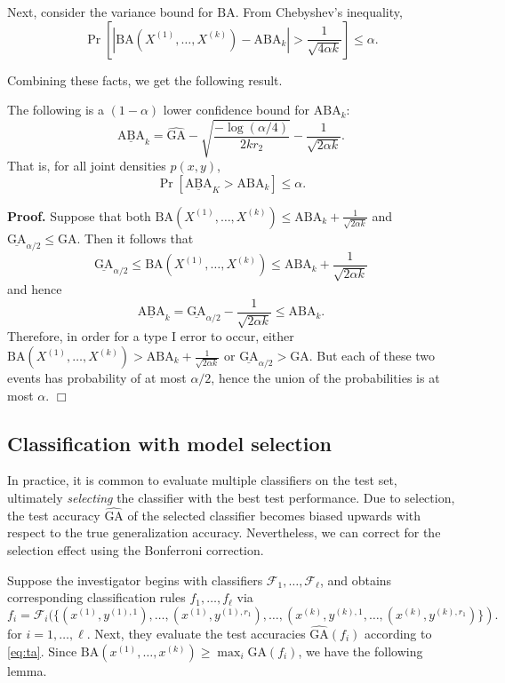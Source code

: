 \documentclass[12pt]{article}
\begin{document}
Next, consider the variance bound for $\text{BA}$.  From Chebyshev's inequality,
\[
\Pr[|\text{BA}(X^{(1)},\hdots, X^{(k)}) - \text{ABA}_k| > \frac{1}{\sqrt{4\alpha k}}] \leq \alpha.
\]

Combining these facts, we get the following result.

\begin{theorem}
The following is a $(1-\alpha)$ lower confidence bound for $\text{ABA}_k$:
\[
\underline{\text{ABA}}_k = \widehat{\text{GA}} - \sqrt{\frac{-\log(\alpha/4)}{2kr_2}} - \frac{1}{\sqrt{2\alpha k}}.
\]
That is, for all joint densities $p(x, y)$,
\[
\Pr[\underline{\text{ABA}}_K > \text{ABA}_k] \leq \alpha.
\]
\end{theorem}

\textbf{Proof.}
Suppose that both $\text{BA}(X^{(1)},\hdots,
X^{(k)}) \leq \text{ABA}_k + \frac{1}{\sqrt{2\alpha k}}$ and
$\underline{\text{GA}}_{\alpha/2} \leq \text{GA}.$
Then it follows that
\[
\underline{\text{GA}}_{\alpha/2} \leq \text{BA}(X^{(1)},\hdots,
X^{(k)}) \leq \text{ABA}_k + \frac{1}{\sqrt{2\alpha k}}
\]
and hence
\[
\underline{\text{ABA}}_k = \underline{\text{GA}}_{\alpha/2} -  \frac{1}{\sqrt{2\alpha k}} \leq \text{ABA}_k.
\]
Therefore, in order for a type I error to occur, either
$\text{BA}(X^{(1)},\hdots, X^{(k)}) > \text{ABA}_k
+ \frac{1}{\sqrt{2\alpha k}}$ or $\underline{\text{GA}}_{\alpha/2}
> \text{GA}.$ But each of these two events has probability of at most
$\alpha/2$, hence the union of the probabilities is at most
$\alpha$. $\Box$

\subsection{Classification with model selection}

In practice, it is common to evaluate multiple classifiers on the test
set, ultimately \emph{selecting} the classifier with the best test
performance.  Due to selection, the test accuracy
$\widehat{\text{GA}}$ of the selected classifier becomes biased
upwards with respect to the true generalization
accuracy. Nevertheless, we can correct for the selection effect using
the Bonferroni correction.

Suppose the investigator begins with classifiers
$\mathcal{F}_1,\hdots, \mathcal{F}_\ell$, and obtains corresponding
classification rules $f_1,\hdots, f_\ell$ via
\[
f_i = \mathcal{F}_i(\{(x^{(1)}, y^{(1),1}),\hdots, (x^{(1)},y^{(1),r_1}), \hdots, (x^{(k)}, y^{(k),1},\hdots, (x^{(k)},y^{(k), r_1})\}).
\]
for $i = 1,\hdots, \ell$.  Next, they evaluate the test accuracies
$\widehat{\text{GA}}(f_i)$ according to \eqref{eq:ta}.
Since $\text{BA}(x^{(1)},\hdots, x^{(k)}) \geq \max_i \text{GA}(f_i)$, we have the following lemma.
\end{document}
